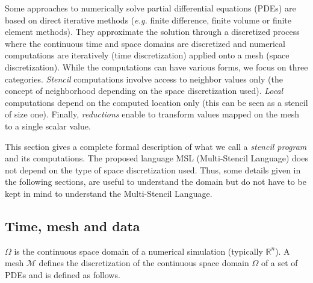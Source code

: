 Some approaches to numerically solve partial differential equations (PDEs) are based on direct iterative methods (\textit{e.g.} finite difference, finite volume or finite element methods).
They approximate the solution through a discretized process where the continuous time and space domains are discretized and numerical computations are iteratively (time discretization) applied onto a mesh (space discretization).
While the computations can have various forms, we focus on three categories.
\emph{Stencil} computations involve access to neighbor values only (the concept of neighborhood depending on the space discretization used).
\emph{Local} computations depend on the computed location only (this can be seen as a stencil of size one).
Finally, \emph{reductions} enable to transform values mapped on the mesh to a single scalar value.

This section gives a complete formal description of what we call a \textit{stencil program} and its computations.
The proposed language MSL (Multi-Stencil Language) does not depend on the type of space discretization used.
Thus, some details given in the following sections, are useful to understand the domain but do not have to be kept in mind to understand the Multi-Stencil Language.

\subsection{Time, mesh and data}

$\Omega$ is the continuous space domain of a numerical simulation (typically $\mathbb{R}^n$). %
A mesh $\mathcal{M}$ defines the discretization of the continuous space domain $\Omega$ of a set of PDEs and is defined as follows.

